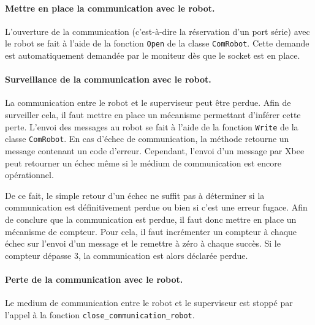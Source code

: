 \paragraph{Mettre en place la communication avec le robot.} L'ouverture de la communication (c'est-à-dire la réservation d'un port série) avec le robot se fait à l'aide de la fonction {\tt Open} de la classe {\tt ComRobot}. Cette demande est automatiquement demandée par le moniteur dès que le socket est en place.\\


\paragraph{Surveillance de la communication avec le robot.} La communication entre le robot et le superviseur peut être perdue. Afin de surveiller cela, il faut mettre en place un mécanisme permettant d'inférer cette perte. L'envoi des messages au robot se fait à l'aide de la fonction {\tt Write} de la classe {\tt ComRobot}. En cas d'échec de communication, la méthode retourne un message contenant un code d'erreur. Cependant, l'envoi d'un message par Xbee peut retourner un échec même si le médium de communication est encore opérationnel.

De ce fait, le simple retour d'un échec ne suffit pas à déterminer si la communication est définitivement perdue ou bien si c'est une erreur fugace. Afin de conclure que la communication est perdue, il faut donc mettre en place un mécanisme de compteur. Pour cela, il faut incrémenter un compteur à chaque échec sur l'envoi d'un message et le remettre à zéro à chaque succès. Si le compteur dépasse 3, la communication est alors déclarée perdue.\\


\paragraph{Perte de la communication avec le robot.} Le medium de communication entre le robot et le superviseur est stoppé par l'appel à la fonction {\tt close\_communication\_robot}.\\

